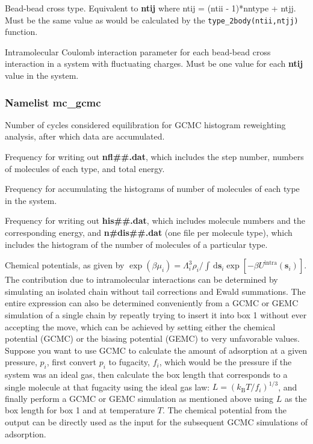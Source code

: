 \documentclass[12pt,letterpaper]{article}
\begin{document}
 Bead-bead cross type. Equivalent to {\bf ntij} where
ntij = (ntii - 1)*nntype + ntjj. Must be the same value as would be calculated by the
{\tt type\_2body(ntii,ntjj)} function. 

 Intramolecular Coulomb interaction parameter for each 
bead-bead cross interaction in a system with fluctuating charges. 
Must be one value for each {\bf ntij} value in the system.

\subsubsection{Namelist \textbf{mc\_gcmc}}
 Number of cycles considered
equilibration for GCMC histogram reweighting analysis, after
which data are accumulated.

 Frequency for writing out {\bf
  nfl\#\#.dat}, which includes the step number, numbers of
molecules of each type, and total energy.

 Frequency for accumulating the
histograms of number of molecules of each type in the
system.

 Frequency for writing out {\bf
  his\#\#.dat}, which includes molecule numbers and the
corresponding energy, and {\bf n\#dis\#\#.dat} (one file per
molecule type), which includes the histogram of the number
of molecules of a particular type.

 Chemical potentials, as given by
$\exp(\beta\mu_i)=\Lambda_i^3\rho_i/\int\,\mathrm{d}\mathbf{s}_i\exp[-\beta U^{\text{intra}}(\mathbf{s}_i)]$.
The contribution due to intramolecular interactions can be
determined by simulating an isolated chain without tail
corrections and Ewald summations. The entire expression can
also be determined conveniently from a GCMC or GEMC
simulation of a single chain by repeatly trying to insert it
into box 1 without ever accepting the move, which can be
achieved by setting either the chemical potential (GCMC) or
the biasing potential (GEMC) to very unfavorable values.
Suppose you want to use GCMC to calculate the amount of
adsorption at a given pressure, $p_i$, first convert $p_i$
to fugacity, $f_i$, which would be the pressure if the
system was an ideal gas, then calculate the box length that
corresponds to a single molecule at that fugacity using the
ideal gas law: $L=(k_{\text{B}}T/f_i)^{1/3}$, and finally
perform a GCMC or GEMC simulation as mentioned above using
$L$ as the box length for box 1 and at temperature $T$. The
chemical potential from the output can be directly used as
the input for the subsequent GCMC simulations of adsorption.
\end{document}
